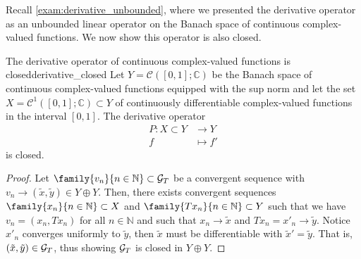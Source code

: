 Recall \cref{exam:derivative_unbounded}, where we presented the derivative operator as an unbounded linear operator on the Banach space of continuous complex-valued functions. We now show this operator is also closed.
\begin{example}{The derivative operator of continuous complex-valued functions is closed}{derivative_closed}
    Let \(Y = \mathcal{C}([0,1]; \mathbb{C})\) be the Banach space of continuous complex-valued functions equipped with the sup norm and let the set \(X = \mathcal{C}^1([0,1];\mathbb{C})\subset Y\) of continuously differentiable complex-valued functions in the interval \([0,1]\). The derivative operator
    \begin{align*}
        P : X \subset Y &\to Y\\
            f &\mapsto f'
    \end{align*}
    is closed.
\end{example}
\begin{proof}
    Let \(\family{v_n}{n \in \mathbb{N}} \subset \graph{T}\) be a convergent sequence with \(v_n \to (\tilde{x}, \tilde{y}) \in Y \oplus Y\). Then, there exists convergent sequences \(\family{x_n}{n \in \mathbb{N}} \subset X\) and \(\family{Tx_n}{n \in \mathbb{N}} \subset Y\) such that we have \(v_n = (x_n, Tx_n)\) for all \(n \in \mathbb{N}\) and such that \(x_n \to \tilde{x}\) and \(Tx_n = x'_n \to \tilde{y}\). Notice \(x'_n\) converges uniformly to \(\tilde{y}\), then \(\tilde{x}\) must be differentiable with \(\tilde{x}' = \tilde{y}\). That is, \((\tilde{x}, \tilde{y}) \in \mathcal{G}_{T}\), thus showing \(\mathcal{G}_{T}\) is closed in \(Y \oplus Y\).
\end{proof}

